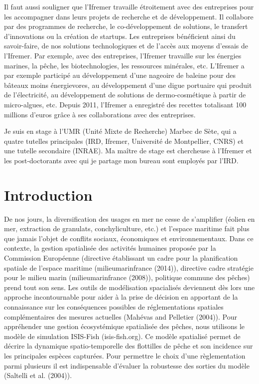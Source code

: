 \documentclass[
]{article}
\begin{document}
Il faut aussi souligner que l'Ifremer travaille étroitement avec des
entreprises pour les accompagner dans leurs projets de recherche et de
développement. Il collabore par des programmes de recherche, le
co-développement de solutions, le transfert d'innovations ou la création
de startups. Les entreprises bénéficient ainsi du savoir-faire, de nos
solutions technologiques et de l'accès aux moyens d'essais de l'Ifremer.
Par exemple, avec des entreprises, l'Ifremer travaille sur les énergies
marines, la pêche, les biotechnologies, les ressources minérales, etc.
L'Ifremer a par exemple participé au développement d'une nageoire de
baleine pour des bâteaux moins énergievores, au développement d'une
digue portuaire qui produit de l'électricité, au développement de
solutions de dermo-cosmétique à partir de micro-algues, etc. Depuis
2011, l'Ifremer a enregistré des recettes totalisant 100 millions
d'euros grâce à ses collaborations avec des entreprises.

Je suis en stage à l'UMR (Unité Mixte de Recherche) Marbec de Sète, qui
a quatre tutelles principales (IRD, Ifremer, Université de Montpellier,
CNRS) et une tutelle secondaire (INRAE). Ma maître de stage est
chercheuse à l'Ifremer et les post-doctorants avec qui je partage mon
bureau sont employés par l'IRD.

\hypertarget{introduction}{%
\section{Introduction}\label{introduction}}

De nos jours, la diversification des usages en mer ne cesse de
s'amplifier (éolien en mer, extraction de granulats, conchyliculture,
etc.) et l'espace maritime fait plus que jamais l'objet de conflits
sociaux, économiques et environnementaux. Dans ce contexte, la gestion
spatialisée des activités humaines proposée par la Commission Européenne
(directive établissant un cadre pour la planification spatiale de
l'espace maritime (milieumarinfrance (2014)), directive cadre stratégie
pour le milieu marin (milieumarinfrance (2008)), politique commune des
pêches) prend tout son sens. Les outils de modélisation spacialisés
deviennent dès lors une approche incontournable pour aider à la prise de
décision en apportant de la connaissance sur les conséquences possibles
de réglementations spatiales complémentaires des mesures actuelles
(Mahévas and Pelletier (2004)). Pour appréhender une gestion
écosystémique spatialisée des pêches, nous utilisons le modèle de
simulation ISIS-Fish (isis-fish.org). Ce modèle spatialisé permet de
décrire la dynamique spatio-temporelle des flottilles de pêche et son
incidence sur les principales espèces capturées. Pour permettre le choix
d'une règlementation parmi plusieurs il est indispensable d'évaluer la
robustesse des sorties du modèle (Saltelli et al. (2004)).
\end{document}
